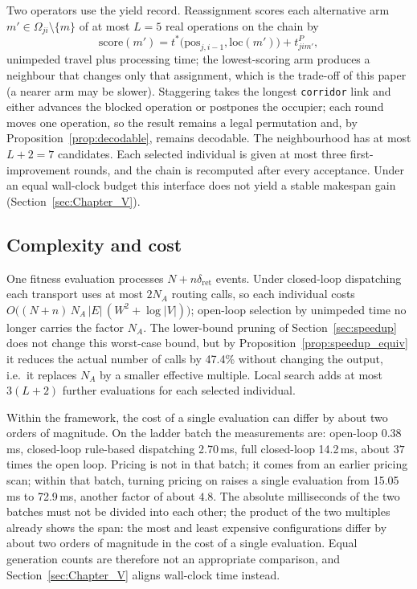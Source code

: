 \documentclass[manuscript,screen,review]{acmart}
\newcommand{\RouteCallCut}{47.4\%}
\newcommand{\MsOpen}{0.38}
\newcommand{\MsLoopRule}{2.70}
\newcommand{\MsLoopProbe}{14.2}
\newcommand{\MsPriced}{72.9}
\newcommand{\MsPricedRef}{15.05}         %
\begin{document}
Two operators use the yield record.
Reassignment scores each alternative arm $m'\in\Omega_{ji}\setminus\{m\}$ of at most $L=5$ real operations on the chain by
\begin{equation}
\label{eq:reassign}
\mathrm{score}(m')=t^{*}\bigl(\mathrm{pos}_{j,i-1},\mathrm{loc}(m')\bigr)
+t^{P}_{jim'},
\end{equation}
unimpeded travel plus processing time; the lowest-scoring arm produces a neighbour that changes only that assignment, which is the trade-off of this paper (a nearer arm may be slower).
Staggering takes the longest \texttt{corridor} link and either advances the blocked operation or postpones the occupier; each round moves one operation, so the result remains a legal permutation and, by Proposition~\ref{prop:decodable}, remains decodable.
The neighbourhood has at most $L+2=7$ candidates.
Each selected individual is given at most three first-improvement rounds, and the chain is recomputed after every acceptance.
Under an equal wall-clock budget this interface does not yield a stable makespan gain (Section~\ref{sec:Chapter_V}).

\subsection{Complexity and cost}
\label{sec:complexity}

One fitness evaluation processes $N+n\delta_{\mathrm{ret}}$ events.
Under closed-loop dispatching each transport uses at most $2N_A$ routing calls, so each individual costs
$O\bigl((N+n)\,N_A\,|E|\,(W^{2}+\log|V|)\bigr)$; open-loop selection by unimpeded time no longer carries the factor $N_A$.
The lower-bound pruning of Section~\ref{sec:speedup} does not change this worst-case bound, but by Proposition~\ref{prop:speedup_equiv} it reduces the actual number of calls by \RouteCallCut{} without changing the output, i.e.\ it replaces $N_A$ by a smaller effective multiple.
Local search adds at most $3(L+2)$ further evaluations for each selected individual.

Within the framework, the cost of a single evaluation can differ by about two orders of magnitude.
On the ladder batch the measurements are: open-loop \MsOpen{}\,ms, closed-loop rule-based dispatching \MsLoopRule{}\,ms, full closed-loop \MsLoopProbe{}\,ms, about $37$ times the open loop.
Pricing is not in that batch; it comes from an earlier pricing scan; within that batch, turning pricing on raises a single evaluation from \MsPricedRef{}\,ms to \MsPriced{}\,ms, another factor of about $4.8$.
The absolute milliseconds of the two batches must not be divided into each other; the product of the two multiples already shows the span: the most and least expensive configurations differ by about two orders of magnitude in the cost of a single evaluation.
Equal generation counts are therefore not an appropriate comparison, and Section~\ref{sec:Chapter_V} aligns wall-clock time instead.
\end{document}
